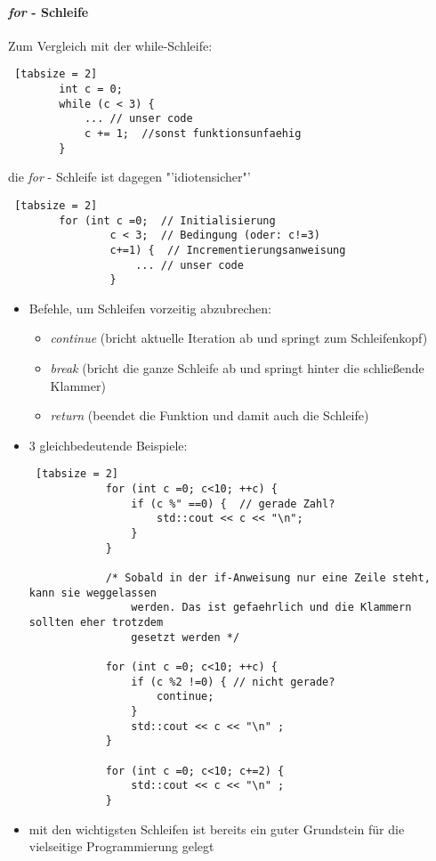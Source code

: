 \documentclass{article}
\begin{document}
	\paragraph{\textit{for} - Schleife}
	Zum Vergleich mit der while-Schleife:
	\begin{lstlisting} [tabsize = 2]
		int c = 0;
		while (c < 3) {
			... // unser code
			c += 1;  //sonst funktionsunfaehig
		}
	\end{lstlisting}
	die \textit{for} - Schleife ist dagegen "'idiotensicher"'
	\begin{lstlisting} [tabsize = 2]
		for (int c =0;  // Initialisierung
				c < 3;  // Bedingung (oder: c!=3)
				c+=1) {  // Incrementierungsanweisung
					... // unser code
				}
	\end{lstlisting}
	\begin{itemize}
		\item Befehle, um Schleifen vorzeitig abzubrechen:
		\begin{itemize}
			\item \textit{continue} (bricht aktuelle Iteration ab und springt zum Schleifenkopf)
			\item \textit{break} (bricht die ganze Schleife ab und springt hinter die schließende Klammer)
			\item \textit{return} (beendet die Funktion und damit auch die Schleife)
		\end{itemize}
		\item 3 gleichbedeutende Beispiele:
		\begin{lstlisting} [tabsize = 2]
			for (int c =0; c<10; ++c) {
				if (c %" ==0) {  // gerade Zahl?
					std::cout << c << "\n";
				}
			}
			
			/* Sobald in der if-Anweisung nur eine Zeile steht, kann sie weggelassen 
				werden. Das ist gefaehrlich und die Klammern sollten eher trotzdem
				gesetzt werden */
			
			for (int c =0; c<10; ++c) {
				if (c %2 !=0) { // nicht gerade?
					continue;
				}
				std::cout << c << "\n" ;
			}
			
			for (int c =0; c<10; c+=2) {
				std::cout << c << "\n" ;
			}
		\end{lstlisting}
		\item mit den wichtigsten Schleifen ist bereits ein guter Grundstein für die vielseitige Programmierung gelegt
	\end{itemize}
	
\end{document}

